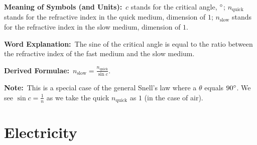 \documentclass[8pt]{article}
\newcommand{\MeanSymb}{\textbf{Meaning of Symbols (and Units):}\ }
\newcommand{\WordExpl}{\textbf{Word Explanation:}\ }
\newcommand{\DeriForm}{\textbf{Derived Formulae:}\ }
\newcommand{\Note}{\textbf{Note:}\ }
\begin{document}
\begin{enumerate}
                \MeanSymb \(c\) stands for the critical angle, \(^\circ\); \(n_{\text{quick}}\) stands for the refractive index in the quick medium, dimension of \(1\); \(n_{\text{slow}}\) stands for the refractive index in the slow medium, dimension of \(1\).

                \WordExpl The sine of the critical angle is equal to the ratio between the refractive index of the fast medium and the slow medium.

                \DeriForm \(n_{\text{slow}} = \frac{n_{\text{quick}}}{\sin c}\).

                \Note This is a special case of the general Snell's law where a \(\theta\) equals \(90 ^\circ\). We see \(\sin c = \frac{1}{n}\) as we take the quick \(n_{\text{quick}}\) as \(1\) (in the case of air).
            \end{enumerate}

    \section{Electricity}
\end{document}
